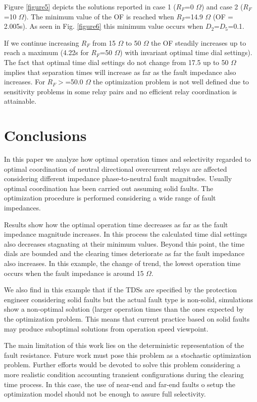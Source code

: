 \documentclass[letterpaper, 10 pt, conference]{IEEEtran}
\begin{document}
 Figure \ref{figure5} depicts the solutions reported in case 1 ($R_F$=0 $\Omega$) and case 2 ($R_F$=10 $\Omega$). The minimum value of the OF is reached when $R_F$=14.9 $\Omega$ (OF = 2.005s). As seen in Fig.  \ref{figure6} this minimum value occurs when $D_2$=$D_5$=0.1.

  If we continue increasing $R_F$ from 15 $\Omega$ to 50 $\Omega$ the OF  steadily increases up to reach a maximum (4.22s for $R_F$=50  $\Omega$) with invariant optimal time dial settings). The fact that optimal time dial settings do not change from 17.5 up to 50 $\Omega$  implies that separation times will increase as far as the fault impedance also increases.  For $R_F>$=50.0  $\Omega$ the optimization problem is not well defined due to sensitivity problems in some relay pairs and no efficient relay coordination is attainable.

\section{Conclusions} \label{conclusions}

In this paper we analyze how optimal operation times and selectivity regarded to optimal coordination of  neutral directional overcurrent relays are affected considering different impedance phase-to-neutral fault magnitudes. Usually optimal coordination has been carried out assuming solid faults. The optimization procedure is performed considering a wide range of fault impedances.

Results show how the optimal operation time decreases as far as the fault impedance magnitude increases. In this process the calculated time dial settings also decreases stagnating at their minimum values. Beyond this point, the time dials are bounded and the clearing times deteriorate as far the fault impedance also increases. In this example, the change of trend, the lowest operation time occurs when the fault impedance is around 15 $\Omega$.

We also find in this example that if the TDSs are specified by the protection engineer considering solid faults but the actual fault type is non-solid, simulations show a non-optimal solution (larger operation times than the ones expected by the optimization problem. This means that current practice based on solid faults may produce suboptimal solutions from operation speed viewpoint.

The main limitation of this work lies on the deterministic representation of the fault resistance. Future work must pose this problem as a stochastic optimization problem. Further efforts would be devoted to solve this problem considering a more realistic condition accounting transient configurations during the clearing time process. In this case, the use of near-end and far-end faults o setup the optimization model should not be enough to assure full selectivity.
\end{document}
